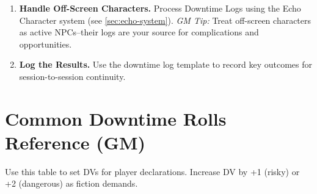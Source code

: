 \begin{enumerate}
\begin{itemize}
          \item \textbf{Campaign Timers}: Advance Mandate/Crisis/faction timers based on player choices (see \ref{sec:downtime-timers}).
          \item \textbf{Obligation Clearing}: When players clear Obligation via acts of service, describe the narrative cost (e.g., ``You spend the day repairing the temple roof--your hands blister, but the priests nod in approval'').
        \end{itemize}
  \item \textbf{Handle Off-Screen Characters.} 
        Process Downtime Logs using the Echo Character system (see \ref{sec:echo-system}).
        \textit{GM Tip:} Treat off-screen characters as active NPCs--their logs are your source for complications and opportunities.
  \item \textbf{Log the Results.} 
        Use the downtime log template to record key outcomes for session-to-session continuity.
\end{enumerate}

\section{Common Downtime Rolls Reference (GM)}
\label{sec:downtime-ref}
Use this table to set DVs for player declarations. Increase DV by +1 (risky) or +2 (dangerous) as fiction demands.

